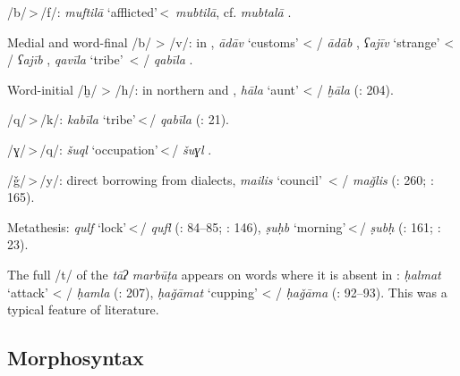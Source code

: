 \documentclass[output=paper]{langsci/langscibook}
\begin{document}
\begin{altdescription}
\item[/b/\,>\,/f/:] \emph{muftilā} ‘afflicted’\,<\, \textit{mubtilā}, cf.   \textit{mubtalā} \citep{Borjian2017}.

\item[Medial and word-final /b/ > /v/:] in , \textit{ādāv} ‘customs’ < \slash{} \textit{ādāb} \citep[15]{Sarlak2002}, \textit{ʕajīv} ‘strange’ < \slash{} \textit{ʕajīb} \citep[25]{Sarlak2002}, \textit{qavīla} ‘tribe’~< / \textit{qabīla} \citep[199]{Sarlak2002}.

\item[Word-initial /ḫ/ > /h/:] in northern  and , \textit{hāla} ‘aunt’ < \slash{} \textit{ḫāla} (\citealt{Īzadpanāh2001}: 204).

\item[/q/\,>\,/k/:] \textit{kabīla} ‘tribe’\,<\,/ \textit{qabīla} (\citealt{NaǧībiFīni2002}: 21).

\item[/ɣ/\,>\,/q/:] \textit{šuql} ‘occupation’\,<\,/ \textit{šuɣl} \citep{Stilo2001}.

\item[/ǧ/\,>\,/y/:] direct borrowing from   dialects, \textit{mailis} ‘council’~< \slash{} \textit{maǧlis} (\citealt{Sarlak2002}: 260; \citealt{Fāẓilī2004}: 165).

\item[Metathesis:] \textit{qulf} ‘lock’\,<\,/ \textit{qufl} (\citealt{Salāmī2004}: 84–85; \citealt{ImāmAhwāzī2000}: 146), \textit{ṣuḥb} ‘morning’\,<\,/ \textit{ṣubḥ} (\citealt{Dānišgar1995}: 161; \citealt{NaǧībiFīni2002}: 23).
\end{altdescription}

The full /t/ of the \textit{tāʔ} \textit{marbūṭa} appears on words where it is absent in : \textit{ḥalmat} ‘attack’ < / \textit{ḥamla} (\citealt{Īzadpanāh2001}: 207), \textit{ḥaǧāmat} ‘cupping’ < / \textit{ḥaǧāma} (\citealt{Salāmī2004}: 92–93). This was a typical feature of  literature.

\subsection{Morphosyntax}
\end{document}
